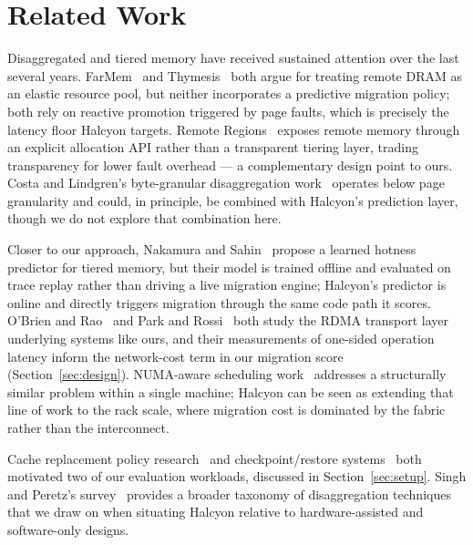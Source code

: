 \section{Related Work}
Disaggregated and tiered memory have received sustained attention over the last several years. FarMem~\cite{chen2021farmem} and Thymesis~\cite{alvarado2020thymesis} both argue for treating remote DRAM as an elastic resource pool, but neither incorporates a predictive migration policy; both rely on reactive promotion triggered by page faults, which is precisely the latency floor Halcyon targets. Remote Regions~\cite{devries2018remote} exposes remote memory through an explicit allocation API rather than a transparent tiering layer, trading transparency for lower fault overhead --- a complementary design point to ours. Costa and Lindgren's byte-granular disaggregation work~\cite{costa2020granular} operates below page granularity and could, in principle, be combined with Halcyon's prediction layer, though we do not explore that combination here.

Closer to our approach, Nakamura and Sahin~\cite{nakamura2022learned} propose a learned hotness predictor for tiered memory, but their model is trained offline and evaluated on trace replay rather than driving a live migration engine; Halcyon's predictor is online and directly triggers migration through the same code path it scores. O'Brien and Rao~\cite{obrien2019paging} and Park and Rossi~\cite{park2021onesided} both study the RDMA transport layer underlying systems like ours, and their measurements of one-sided operation latency inform the network-cost term in our migration score (Section~\ref{sec:design}). NUMA-aware scheduling work~\cite{oyelaran2020numa} addresses a structurally similar problem within a single machine; Halcyon can be seen as extending that line of work to the rack scale, where migration cost is dominated by the fabric rather than the interconnect.

Cache replacement policy research~\cite{fontaine2017cache} and checkpoint/restore systems~\cite{lindqvist2019checkpoint} both motivated two of our evaluation workloads, discussed in Section~\ref{sec:setup}. Singh and Peretz's survey~\cite{singh2022survey} provides a broader taxonomy of disaggregation techniques that we draw on when situating Halcyon relative to hardware-assisted and software-only designs.
